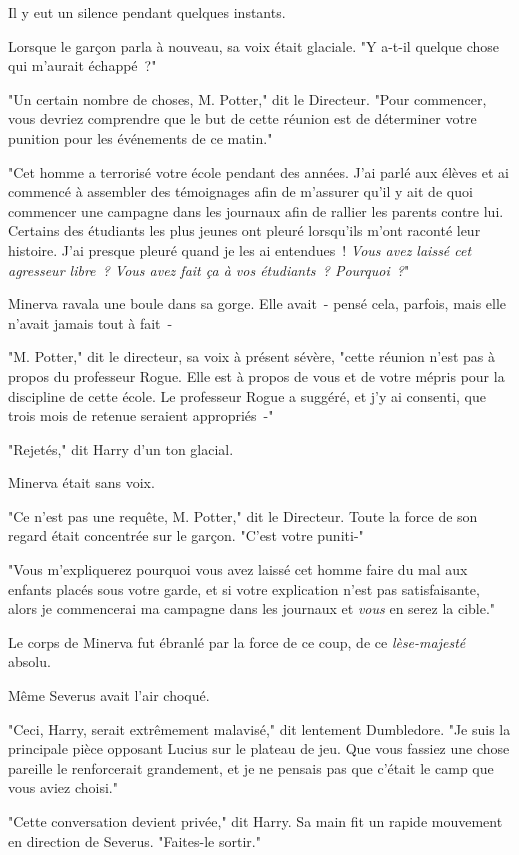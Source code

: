 Il y eut un silence pendant quelques instants.

Lorsque le garçon parla à nouveau, sa voix était glaciale. "Y a-t-il quelque chose qui m'aurait échappé~?"

"Un certain nombre de choses, M. Potter," dit le Directeur. "Pour commencer, vous devriez comprendre que le but de cette réunion est de déterminer votre punition pour les événements de ce matin."

"Cet homme a terrorisé votre école pendant des années. J'ai parlé aux élèves et ai commencé à assembler des témoignages afin de m'assurer qu'il y ait de quoi commencer une campagne dans les journaux afin de rallier les parents contre lui. Certains des étudiants les plus jeunes ont pleuré lorsqu'ils m'ont raconté leur histoire. J'ai presque pleuré quand je les ai entendues~! \emph{Vous avez laissé cet agresseur libre~? Vous avez fait ça à vos étudiants~? Pourquoi~?}"

Minerva ravala une boule dans sa gorge. Elle avait~- pensé cela, parfois, mais elle n'avait jamais tout à fait~-

"M. Potter," dit le directeur, sa voix à présent sévère, "cette réunion n'est pas à propos du professeur Rogue. Elle est à propos de vous et de votre mépris pour la discipline de cette école. Le professeur Rogue a suggéré, et j'y ai consenti, que trois mois de retenue seraient appropriés~-"

"Rejetés," dit Harry d'un ton glacial.

Minerva était sans voix.

"Ce n'est pas une requête, M. Potter," dit le Directeur. Toute la force de son regard était concentrée sur le garçon. "C'est votre puniti-"

"Vous m'expliquerez pourquoi vous avez laissé cet homme faire du mal aux enfants placés sous votre garde, et si votre explication n'est pas satisfaisante, alors je commencerai ma campagne dans les journaux et \emph{vous} en serez la cible."

Le corps de Minerva fut ébranlé par la force de ce coup, de ce \emph{lèse-majesté} absolu.

Même Severus avait l'air choqué.

"Ceci, Harry, serait extrêmement malavisé," dit lentement Dumbledore. "Je suis la principale pièce opposant Lucius sur le plateau de jeu. Que vous fassiez une chose pareille le renforcerait grandement, et je ne pensais pas que c'était le camp que vous aviez choisi."

"Cette conversation devient privée," dit Harry. Sa main fit un rapide mouvement en direction de Severus. "Faites-le sortir."

